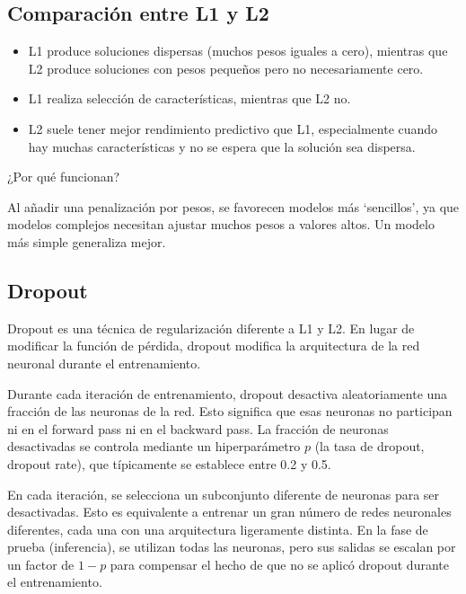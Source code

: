 \documentclass{article}
\begin{document}
\subsection{Comparación entre L1 y L2}
\begin{itemize}
    \item L1 produce soluciones dispersas (muchos pesos iguales a cero), mientras que L2 produce soluciones con pesos pequeños pero no necesariamente cero.
    \item L1 realiza selección de características, mientras que L2 no.
    \item L2 suele tener mejor rendimiento predictivo que L1, especialmente cuando hay muchas características y no se espera que la solución sea dispersa.
\end{itemize}

¿Por qué funcionan?

Al añadir una penalización por pesos, se favorecen modelos más `sencillos', ya que modelos complejos necesitan ajustar muchos pesos a valores altos. Un modelo más simple generaliza mejor.

\subsection{Dropout}

Dropout es una técnica de regularización diferente a L1 y L2.  En lugar de modificar la función de pérdida, dropout modifica la arquitectura de la red neuronal durante el entrenamiento.

Durante cada iteración de entrenamiento, dropout desactiva aleatoriamente una fracción de las neuronas de la red.  Esto significa que esas neuronas no participan ni en el forward pass ni en el backward pass.  La fracción de neuronas desactivadas se controla mediante un hiperparámetro \(p\) (la tasa de dropout, dropout rate), que típicamente se establece entre 0.2 y 0.5.

En cada iteración, se selecciona un subconjunto diferente de neuronas para ser desactivadas.  Esto es equivalente a entrenar un gran número de redes neuronales diferentes, cada una con una arquitectura ligeramente distinta.  En la fase de prueba (inferencia), se utilizan todas las neuronas, pero sus salidas se escalan por un factor de \(1-p\) para compensar el hecho de que no se aplicó dropout durante el entrenamiento.
\end{document}
